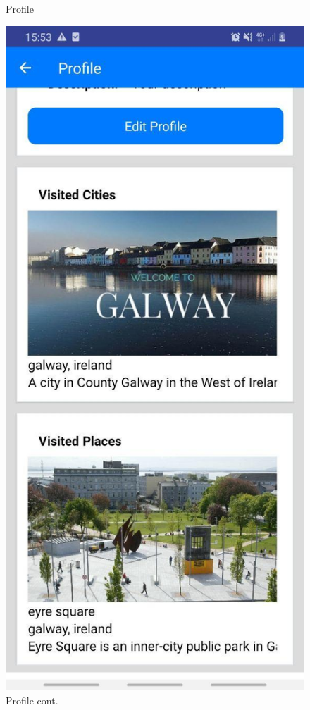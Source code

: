 \begin{figure}[h!]
\begin{minipage}[t]{0.48\textwidth}
\caption{Profile }
\label{fig:Profile}
\end{minipage}
\hspace*{\fill} %
\begin{minipage}[t]{0.48\textwidth}
\includegraphics[width=\linewidth,keepaspectratio=true]{img/profile2.jpg}
\caption{Profile cont.}
\label{fig:Profile2}
\end{minipage}
\end{figure}


